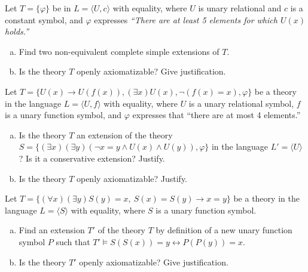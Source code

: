 \begin{problem}

    Let $T=\{\varphi\}$ be in $L=\langle U, c \rangle$ with equality, where $U$ is unary relational and $c$ is a constant symbol, and $\varphi$ expresses \emph{``There are at least 5 elements for which $U(x)$ holds.''}
    \begin{enumerate}[(a)]
        \item Find two non-equivalent complete simple extensions of $T$.
        \item Is the theory $T$ openly axiomatizable? Give justification.
    \end{enumerate}

\end{problem}


\begin{problem}

    Let $T = \{U(x) \to U(f(x)), (\exists x)U(x), \neg (f(x) = x), \varphi\}$ be a theory in the language $L = \langle U, f \rangle$ with equality, where $U$ is a unary relational symbol, $f$ is a unary function symbol, and $\varphi$ expresses that ``there are at most 4 elements.''
    \begin{enumerate}[(a)]
        \item Is the theory $T$ an extension of the theory $S = \{ (\exists x)(\exists y)(\neg x = y \land U(x) \land U(y)), \varphi \}$ in the language $L' = \langle U \rangle$? Is it a conservative extension? Justify.
        \item Is the theory $T$ openly axiomatizable? Justify.    
    \end{enumerate}
\end{problem}


\begin{problem}

    Let $T=\{(\forall x)(\exists y) S(y)=x,\ S(x)=S(y)\to x=y\}$ be a theory in the language $L=\langle S\rangle$ with equality, where $S$ is a unary function symbol.
    \begin{enumerate}[(a)]
        \item Find an extension $T'$ of the theory $T$ by definition of a new unary function symbol $P$ such that $T' \models S(S(x))=y \leftrightarrow P(P(y))=x$.
        \item Is the theory $T'$ openly axiomatizable? Give justification.
    \end{enumerate}

\end{problem} 


